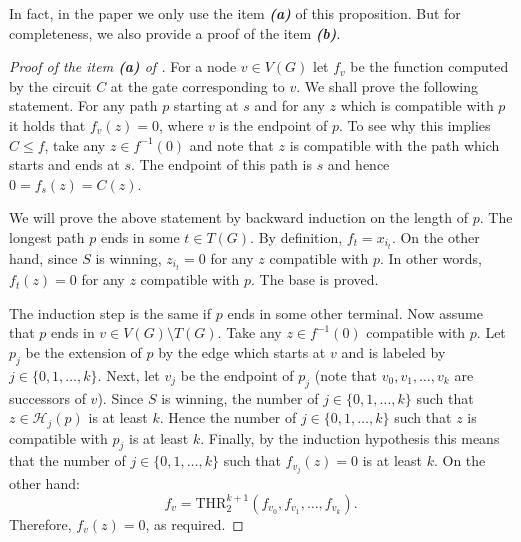 \documentclass{toc}
\def\THR{\mathrm{THR}}
\begin{document}
In fact, in the paper  we only use the item \textbf{\emph{(a)}} of this proposition. But for completeness, we also provide a proof of the item \textbf{\emph{(b)}}.

\begin{proof}[Proof of the item \textbf{(a)} of ]
For a node $v \in V(G)$ let $f_v$ be the function computed by the circuit $C$ at the gate corresponding to $v$. We shall prove the following statement. For any path $p$ starting at $s$ and for any $z$ which is compatible with $p$ it holds that $f_v(z) = 0$, where $v$ is the endpoint of $p$. To see why this implies $C\le f$, take any $z\in f^{-1}(0)$ and note that $z$ is compatible with the path which starts and ends at $s$. The endpoint of this path is $s$ and hence $0 = f_s(z) = C(z)$.

We will prove the above statement by backward induction on the length of $p$. The longest path $p$ ends in some $t\in T(G)$. By definition, $f_t = x_{i_t}$. On the other hand, since $S$ is winning, $z_{i_t} = 0$ for any $z$ compatible with $p$. In other words, $f_t(z) = 0$ for any $z$ compatible with $p$. The base is proved.

The induction step is the same if $p$ ends in some other terminal. Now assume that $p$ ends in $v\in V(G)\setminus T(G)$. Take any $z\in f^{-1}(0)$ compatible with $p$. Let $p_j$ be the extension of $p$ by the edge which starts at $v$ and is labeled by $j\in\{0, 1, \ldots, k\}$. Next, let $v_j$ be the endpoint of $p_j$ (note that $v_0, v_1, \ldots, v_k$ are successors of $v$). Since $S$ is winning, the number of $j\in\{0, 1, \ldots, k\}$ such that $z\in \mathcal{H}_j(p)$ is at least $k$. Hence the number of $j\in \{0, 1, \ldots, k\}$ such that $z$ is compatible with $p_j$ is at least $k$. Finally, by the induction hypothesis this means that the number of $j\in\{0, 1, \ldots, k\}$ such that $f_{v_j}(z) = 0$ is at least $k$. On the other hand:
\[f_v = \THR^{k + 1}_2(f_{v_0}, f_{v_1}, \ldots, f_{v_k}).\]
Therefore, $f_v(z) = 0$, as required.
\end{proof}
\end{document}
